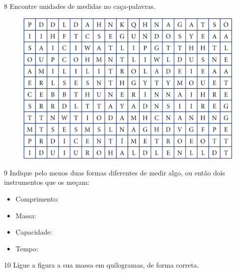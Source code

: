 \num{8} Encontre unidades de medidas no caça-palavras.

\begin{figure}[H]
\centering
\includegraphics[width=.8\textwidth]{./media/image40.png}
\end{figure}


\num{9} Indique pelo menos duas formas diferentes de medir algo, ou então dois
instrumentos que os meçam:

\begin{itemize}
\item Comprimento:


\item Massa:


\item Capacidade:


\item Tempo:

\end{itemize}

\num{10} Ligue a figura a sua massa em quilogramas, de forma correta.

